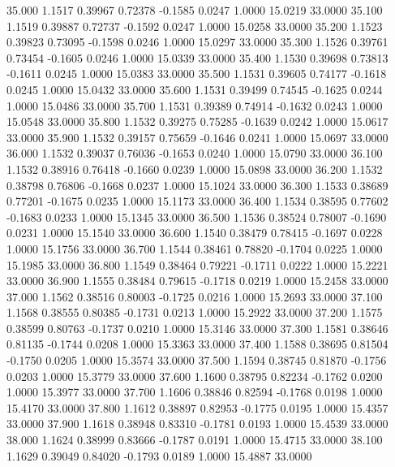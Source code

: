   35.000   1.1517   0.39967   0.72378  -0.1585   0.0247   1.0000  15.0219  33.0000
  35.100   1.1519   0.39887   0.72737  -0.1592   0.0247   1.0000  15.0258  33.0000
  35.200   1.1523   0.39823   0.73095  -0.1598   0.0246   1.0000  15.0297  33.0000
  35.300   1.1526   0.39761   0.73454  -0.1605   0.0246   1.0000  15.0339  33.0000
  35.400   1.1530   0.39698   0.73813  -0.1611   0.0245   1.0000  15.0383  33.0000
  35.500   1.1531   0.39605   0.74177  -0.1618   0.0245   1.0000  15.0432  33.0000
  35.600   1.1531   0.39499   0.74545  -0.1625   0.0244   1.0000  15.0486  33.0000
  35.700   1.1531   0.39389   0.74914  -0.1632   0.0243   1.0000  15.0548  33.0000
  35.800   1.1532   0.39275   0.75285  -0.1639   0.0242   1.0000  15.0617  33.0000
  35.900   1.1532   0.39157   0.75659  -0.1646   0.0241   1.0000  15.0697  33.0000
  36.000   1.1532   0.39037   0.76036  -0.1653   0.0240   1.0000  15.0790  33.0000
  36.100   1.1532   0.38916   0.76418  -0.1660   0.0239   1.0000  15.0898  33.0000
  36.200   1.1532   0.38798   0.76806  -0.1668   0.0237   1.0000  15.1024  33.0000
  36.300   1.1533   0.38689   0.77201  -0.1675   0.0235   1.0000  15.1173  33.0000
  36.400   1.1534   0.38595   0.77602  -0.1683   0.0233   1.0000  15.1345  33.0000
  36.500   1.1536   0.38524   0.78007  -0.1690   0.0231   1.0000  15.1540  33.0000
  36.600   1.1540   0.38479   0.78415  -0.1697   0.0228   1.0000  15.1756  33.0000
  36.700   1.1544   0.38461   0.78820  -0.1704   0.0225   1.0000  15.1985  33.0000
  36.800   1.1549   0.38464   0.79221  -0.1711   0.0222   1.0000  15.2221  33.0000
  36.900   1.1555   0.38484   0.79615  -0.1718   0.0219   1.0000  15.2458  33.0000
  37.000   1.1562   0.38516   0.80003  -0.1725   0.0216   1.0000  15.2693  33.0000
  37.100   1.1568   0.38555   0.80385  -0.1731   0.0213   1.0000  15.2922  33.0000
  37.200   1.1575   0.38599   0.80763  -0.1737   0.0210   1.0000  15.3146  33.0000
  37.300   1.1581   0.38646   0.81135  -0.1744   0.0208   1.0000  15.3363  33.0000
  37.400   1.1588   0.38695   0.81504  -0.1750   0.0205   1.0000  15.3574  33.0000
  37.500   1.1594   0.38745   0.81870  -0.1756   0.0203   1.0000  15.3779  33.0000
  37.600   1.1600   0.38795   0.82234  -0.1762   0.0200   1.0000  15.3977  33.0000
  37.700   1.1606   0.38846   0.82594  -0.1768   0.0198   1.0000  15.4170  33.0000
  37.800   1.1612   0.38897   0.82953  -0.1775   0.0195   1.0000  15.4357  33.0000
  37.900   1.1618   0.38948   0.83310  -0.1781   0.0193   1.0000  15.4539  33.0000
  38.000   1.1624   0.38999   0.83666  -0.1787   0.0191   1.0000  15.4715  33.0000
  38.100   1.1629   0.39049   0.84020  -0.1793   0.0189   1.0000  15.4887  33.0000
